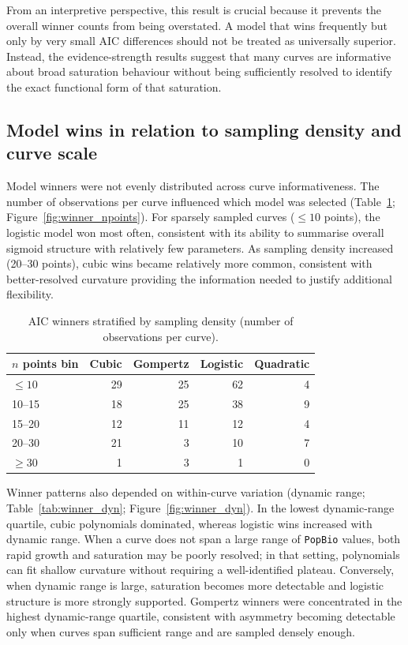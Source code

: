 \documentclass[11pt]{article}
\begin{document}
From an interpretive perspective, this result is crucial because it prevents the overall winner counts from being overstated. A model that wins frequently but only by very small AIC differences should not be treated as universally superior. Instead, the evidence-strength results suggest that many curves are informative about broad saturation behaviour without being sufficiently resolved to identify the exact functional form of that saturation.
\subsection*{Model wins in relation to sampling density and curve scale}
Model winners were not evenly distributed across curve informativeness. The number of observations per curve influenced which model was selected (Table~\ref{tab:winner_npoints}; Figure~\ref{fig:winner_npoints}). For sparsely sampled curves (\(\leq 10\) points), the logistic model won most often, consistent with its ability to summarise overall sigmoid structure with relatively few parameters. As sampling density increased (20--30 points), cubic wins became relatively more common, consistent with better-resolved curvature providing the information needed to justify additional flexibility.
\begin{table}[H]
\centering
\caption{AIC winners stratified by sampling density (number of observations per curve).}
\label{tab:winner_npoints}
\begin{tabular}{lrrrr}
\toprule
$n$ points bin & Cubic & Gompertz & Logistic & Quadratic \\
\midrule
$\leq 10$      & 29 & 25 & 62 & 4 \\
10--15         & 18 & 25 & 38 & 9 \\
15--20         & 12 & 11 & 12 & 4 \\
20--30         & 21 & 3  & 10 & 7 \\
$\geq 30$      & 1  & 3  & 1  & 0 \\
\bottomrule
\end{tabular}
\end{table}
Winner patterns also depended on within-curve variation (dynamic range; Table~\ref{tab:winner_dyn}; Figure~\ref{fig:winner_dyn}). In the lowest dynamic-range quartile, cubic polynomials dominated, whereas logistic wins increased with dynamic range. When a curve does not span a large range of \texttt{PopBio} values, both rapid growth and saturation may be poorly resolved; in that setting, polynomials can fit shallow curvature without requiring a well-identified plateau. Conversely, when dynamic range is large, saturation becomes more detectable and logistic structure is more strongly supported. Gompertz winners were concentrated in the highest dynamic-range quartile, consistent with asymmetry becoming detectable only when curves span sufficient range and are sampled densely enough.
\end{document}
